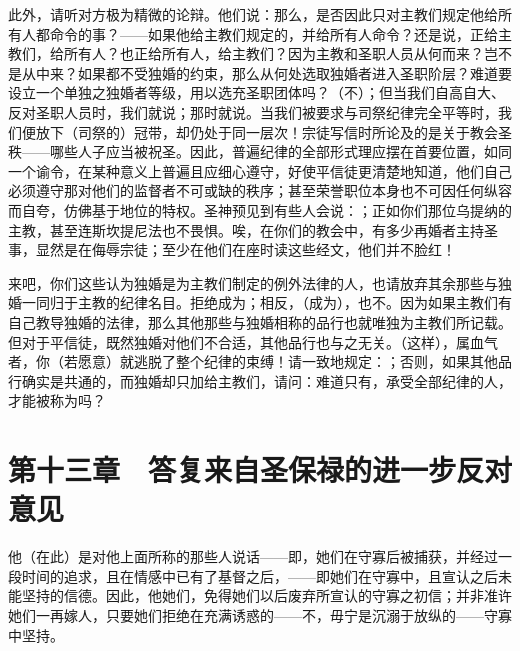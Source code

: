 此外，请听对方极为精微的论辩。他们说：那么，是否因此只对主教们规定他给所有人都命令的事？——如果他给主教们规定的，并给所有人命令？还是说，正给主教们，给所有人？也正给所有人，给主教们？因为主教和圣职人员从何而来？岂不是从中来？如果都不受独婚的约束，那么从何处选取独婚者进入圣职阶层？难道要设立一个单独之独婚者等级，用以选充圣职团体吗？（不）；但当我们自高自大、反对圣职人员时，我们就说；那时就说。当我们被要求与司祭纪律完全平等时，我们便放下（司祭的）冠带，却仍处于同一层次！宗徒写信时所论及的是关于教会圣秩——哪些人子应当被祝圣。因此，普遍纪律的全部形式理应摆在首要位置，如同一个谕令，在某种意义上普遍且应细心遵守，好使平信徒更清楚地知道，他们自己必须遵守那对他们的监督者不可或缺的秩序；甚至荣誉职位本身也不可因任何纵容而自夸，仿佛基于地位的特权。圣神预见到有些人会说：；正如你们那位乌提纳的主教，甚至连斯坎提尼法也不畏惧。唉，在你们的教会中，有多少再婚者主持圣事，显然是在侮辱宗徒；至少在他们在座时读这些经文，他们并不脸红！\par

来吧，你们这些认为独婚是为主教们制定的例外法律的人，也请放弃其余那些与独婚一同归于主教的纪律名目。拒绝成为；相反，（成为），也不。因为如果主教们有自己教导独婚的法律，那么其他那些与独婚相称的品行也就唯独为主教们所记载。但对于平信徒，既然独婚对他们不合适，其他品行也与之无关。（这样），属血气者，你（若愿意）就逃脱了整个纪律的束缚！请一致地规定：；否则，如果其他品行确实是共通的，而独婚却只加给主教们，请问：难道只有，承受全部纪律的人，才能被称为吗？\par


\section{第十三章　答复来自圣保禄的进一步反对意见}

他（在此）是对他上面所称的那些人说话——即，她们在守寡后被捕获，并经过一段时间的追求，且在情感中已有了基督之后，——即她们在守寡中，且宣认之后未能坚持的信德。因此，他她们，免得她们以后废弃所宣认的守寡之初信；并非准许她们一再嫁人，只要她们拒绝在充满诱惑的——不，毋宁是沉溺于放纵的——守寡中坚持。\par

